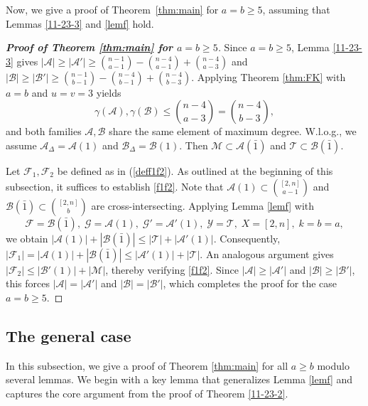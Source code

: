 \documentclass[11pt]{article}
\newcommand{\m}{\mathcal}
\begin{document}
Now, we give a proof of Theorem~\ref{thm:main} for  $a=b\ge 5$, assuming that  Lemmas \ref{11-23-3} and \ref{lemf} hold. 


\begin{proof}[{\bf Proof of Theorem \ref{thm:main} for  $a=b\ge 5$}]
Since $a=b\ge 5$, Lemma \ref{11-23-3} gives $|\m A|\ge |\m A'|\ge {n-1\choose a-1}-{n-4\choose a-1}+{n-4\choose a-3}$ and $|\m B|\ge |\m B'|\ge {n-1\choose b-1}-{n-4\choose b-1}+{n-4\choose b-3}$. Applying Theorem \ref{thm:FK} with $a=b$ and $u=v=3$ yields
\begin{equation*}
    \gamma(\m A), \gamma(\m B) \le {n-4\choose a-3}={n-4\choose b-3},
\end{equation*}
and both families $\m A, \m B$ share the same element of maximum degree. W.l.o.g., we assume $\m A_{\Delta}=\m A(1)$ and  $\m B_{\Delta}=\m B(1)$. Then $\m M \subset \m A(\bar1)$ and $\m T \subset \m B(\bar1)$.

Let $\m F_1, \m F_2$ be defined as in (\ref{deff1f2}). As outlined at the beginning of this subsection, it suffices to establish \eqref{f1f2}.
Note that $\m A(1)\subset {[2,n]\choose a-1}$ and $\m B(\bar{1}) \subset {[2,n]\choose b}$ are cross-intersecting.  %
Applying Lemma \ref{lemf} with
\[
\mathcal{F}=\mathcal{B}(\bar1),\; \mathcal{G}=\mathcal{A}(1),\; \mathcal{G}'=\mathcal{A}'(1),\;
\mathcal{Y}=\mathcal{T},\; X=[2,n],\; k=b=a,
\]
we obtain 
$
|\m A(1)|+|\m B(\bar{1})|\le |\m T|+|\m A'(1)|
$.
Consequently, $|\m F_1|=|\m A(1)|+|\m B(\bar{1})|\le |\m A'(1)|+|\m T|$. 
An analogous argument gives $|\m F_2|\le |\m B'(1)|+|\m M|$, thereby verifying \eqref{f1f2}. 
Since $|\mathcal{A}| \ge |\mathcal{A}'|$ and $|\mathcal{B}| \ge |\mathcal{B}'|$, this forces $|\mathcal{A}| = |\mathcal{A}'|$ and $|\mathcal{B}| = |\mathcal{B}'|$, which completes the proof for the case $a=b\ge 5$.
\end{proof}


\subsection{The general case}
In this subsection, we give a proof of Theorem \ref{thm:main} for all $a\ge b$ modulo several lemmas.
We begin with a key lemma that generalizes Lemma \ref{lemf} and captures the core argument from the proof of Theorem \ref{11-23-2}. 
\end{document}
